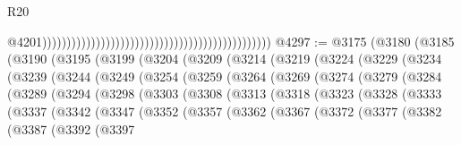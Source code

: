 \begin{lexlean}{R20}
\begin{coremodule}
{                                                                                                  @4201)))))))))))))))))))))))))))))))))))))))))))))))
@4297 := @3175
    (@3180
      (@3185
        (@3190
          (@3195
            (@3199
              (@3204
                (@3209
                  (@3214
                    (@3219
                      (@3224
                        (@3229
                          (@3234
                            (@3239
                              (@3244
                                (@3249
                                  (@3254
                                    (@3259
                                      (@3264
                                        (@3269
                                          (@3274
                                            (@3279
                                              (@3284
                                                (@3289
                                                  (@3294
                                                    (@3298
                                                      (@3303
                                                        (@3308
                                                          (@3313
                                                            (@3318
                                                              (@3323
                                                                (@3328
                                                                  (@3333
                                                                    (@3337
                                                                      (@3342
                                                                        (@3347
                                                                          (@3352
                                                                            (@3357
                                                                              (@3362
                                                                                (@3367
                                                                                  (@3372
                                                                                    (@3377
                                                                                      (@3382
                                                                                        (@3387
                                                                                          (@3392
                                                                                            (@3397
}
\end{coremodule}
\end{lexlean}
